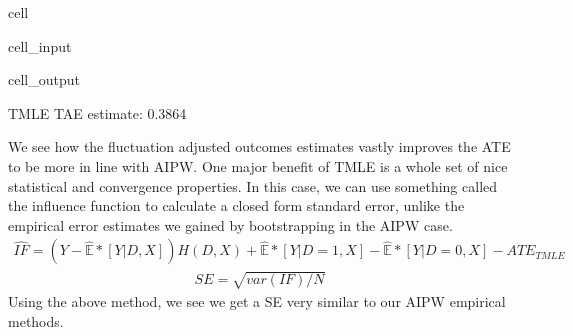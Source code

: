 \documentclass[letterpaper,10pt,english]{jupyterBook}
\begin{document}
\begin{sphinxuseclass}{cell}\begin{sphinxVerbatimInput}

\begin{sphinxuseclass}{cell_input}
\begin{sphinxVerbatim}[commandchars=\\\{\}]
  \PYG{p}{[}\PYG{p}{]}  \PYG{p}{[}\PYG{p}{]}
\end{sphinxVerbatim}

\end{sphinxuseclass}\end{sphinxVerbatimInput}
\begin{sphinxVerbatimOutput}

\begin{sphinxuseclass}{cell_output}
\begin{sphinxVerbatim}[commandchars=\\\{\}]
TMLE TAE estimate: 0.3864
\end{sphinxVerbatim}

\end{sphinxuseclass}\end{sphinxVerbatimOutput}

\end{sphinxuseclass}
\sphinxAtStartPar
We see how the fluctuation adjusted outcomes estimates vastly improves the ATE to be more in line with AIPW. One major benefit of TMLE is a whole set of nice statistical and convergence properties. In this case, we can use something called the influence function to calculate a closed form standard error, unlike the empirical error estimates we gained by bootstrapping in the AIPW case.
\begin{equation*}
\begin{split}\hat{IF} = (Y-\hat{\mathbb{E}}*[Y|D,X])H(D,X) + \hat{\mathbb{E}}*[Y|D=1,X] - \hat{\mathbb{E}}*[Y|D=0,X] - ATE_{TMLE}\end{split}
\end{equation*}\begin{equation*}
\begin{split}SE = \sqrt{var(IF)/N}\end{split}
\end{equation*}
\sphinxAtStartPar
Using the above method, we see we get a SE very similar to our AIPW empirical methods.
\end{document}
